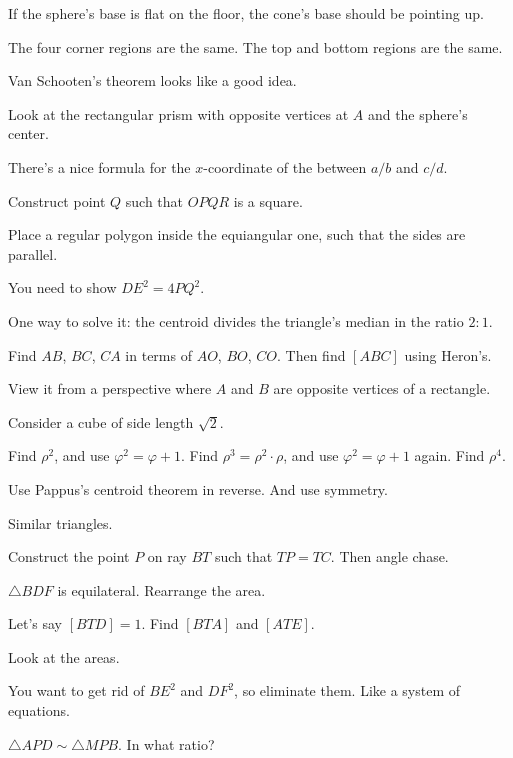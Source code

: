 \documentclass[11pt,paper=letter]{scrartcl}
\begin{document}
\begin{enumthin}[leftmargin=0pt]
\item \label{h:np12} If the sphere's base is flat on the floor, the cone's base should be pointing up.
\item \label{h:os42} The four corner regions are the same. The top and bottom regions are the same.
\item \label{h:pt51} Van Schooten's theorem looks like a good idea.
\item \label{h:gbb3} Look at the rectangular prism with opposite vertices at $A$ and the sphere's center.
\item \label{h:dt41} There's a nice formula for the $x$-coordinate of the between $a/b$ and $c/d$.
\item \label{h:gbf4} Construct point $Q$ such that $OPQR$ is a square.
\item \label{h:vt52} Place a regular polygon inside the equiangular one, such that the sides are parallel.
\item \label{h:eq01} You need to show $DE^2 = 4PQ^2$.
\item \label{h:rd42} One way to solve it: the centroid divides the triangle's median in the ratio $2 : 1$.
\item \label{h:dg52} Find $AB$, $BC$, $CA$ in terms of $AO$, $BO$, $CO$. Then find $[ABC]$ using Heron's.
\item \label{h:gbc3} View it from a perspective where $A$ and $B$ are opposite vertices of a rectangle.
\item \label{h:eq42} Consider a cube of side length $\sqrt2$.
\item \label{h:dt22} Find $\rho^2$, and use $\varphi^2 = \varphi + 1$. Find $\rho^3 = \rho^2 \cdot \rho$, and use $\varphi^2 = \varphi + 1$ again. Find $\rho^4$.
\item \label{h:pc31} Use Pappus's centroid theorem in reverse. And use symmetry.
\item \label{h:gb62} Similar triangles.
\item \label{h:vs42} Construct the point $P$ on ray $BT$ such that $TP = TC$. Then angle chase.
\item \label{h:gba3} $\triangle BDF$ is equilateral. Rearrange the area.
\item \label{h:rt52} Let's say $[BTD] = 1$. Find $[BTA]$ and $[ATE]$.
\item \label{h:an42} Look at the areas.
\item \label{h:eq02} You want to get rid of $BE^2$ and $DF^2$, so eliminate them. Like a system of equations.
\item \label{h:rd31} $\triangle APD \sim \triangle MPB$. In what ratio?

\end{enumthin}
\end{document}
